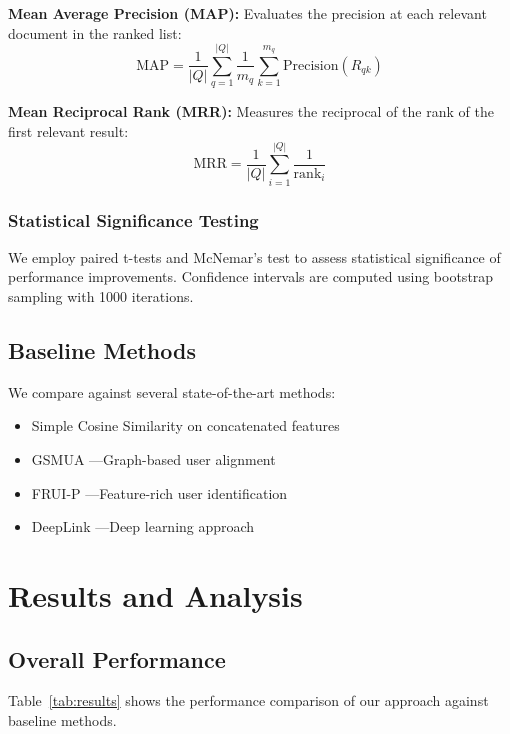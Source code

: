 \documentclass[conference]{IEEEtran}
\begin{document}
\textbf{Mean Average Precision (MAP):} Evaluates the precision at each relevant document in the ranked list:
\begin{equation}
\text{MAP} = \frac{1}{|Q|} \sum_{q=1}^{|Q|} \frac{1}{m_q} \sum_{k=1}^{m_q} \text{Precision}(R_{qk})
\end{equation}

\textbf{Mean Reciprocal Rank (MRR):} Measures the reciprocal of the rank of the first relevant result:
\begin{equation}
\text{MRR} = \frac{1}{|Q|} \sum_{i=1}^{|Q|} \frac{1}{\text{rank}_i}
\end{equation}

\subsubsection{Statistical Significance Testing}
We employ paired t-tests and McNemar's test to assess statistical significance of performance improvements. Confidence intervals are computed using bootstrap sampling with 1000 iterations.

\subsection{Baseline Methods}
We compare against several state-of-the-art methods:
\begin{itemize}
\item Simple Cosine Similarity on concatenated features
\item GSMUA \cite{man2016predict}---Graph-based user alignment
\item FRUI-P \cite{zhou2018deeplink}---Feature-rich user identification
\item DeepLink \cite{zhou2018deeplink}---Deep learning approach
\end{itemize}

\section{Results and Analysis}

\subsection{Overall Performance}
Table~\ref{tab:results} shows the performance comparison of our approach against baseline methods.
\end{document}
